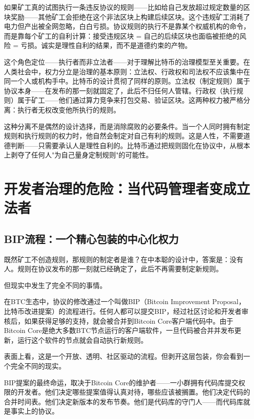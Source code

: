 \documentclass[a4paper,12pt,openany]{ctexbook}
\begin{document}
如果矿工真的试图执行一条违反协议的规则——比如给自己发放超过规定数量的区块奖励——其他矿工会拒绝在这个非法区块上构建后续区块。这个违规矿工消耗了电力但产出被全网忽略，白白亏损。协议规则的执行不是靠某个权威机构的命令，而是靠每个矿工的自利计算：接受违规区块 = 自己的后续区块也面临被拒绝的风险 = 亏损。诚实是理性自利的结果，而不是道德约束的产物。

这个角色定位——执行者而非立法者——对于理解比特币的治理模型至关重要。在人类社会中，权力分立是治理的基本原则：立法权、行政权和司法权不应该集中在同一个人或机构手中。比特币的设计贯彻了同样的原则。立法权（制定规则）属于协议本身——在发布的那一刻就固定了，此后不归任何人管辖。行政权（执行规则）属于矿工——他们通过算力竞争来打包交易、验证区块。这两种权力被严格分离：执行者无权改变他所执行的规则。

这种分离不是偶然的设计选择，而是消除腐败的必要条件。当一个人同时拥有制定规则和执行规则的权力时，他自然会制定对自己有利的规则。这是人性，不需要道德判断——只需要承认人是理性自利的。比特币通过把规则固化在协议中，从根本上剥夺了任何人"为自己量身定制规则"的可能性。


\section*{开发者治理的危险：当代码管理者变成立法者}



\subsection*{BIP流程：一个精心包装的中心化权力}


既然矿工不创造规则，那规则的制定者是谁？在中本聪的设计中，答案是：没有人。规则在协议发布的那一刻就已经确定了，此后不再需要制定新规则。

但现实中发生了完全不同的事情。

在BTC生态中，协议的修改通过一个叫做BIP（Bitcoin Improvement Proposal，比特币改进提案）的流程进行。任何人都可以提交BIP，经过社区讨论和开发者审核后，如果获得足够的支持，就会被合并到Bitcoin Core客户端代码中。由于Bitcoin Core是绝大多数BTC节点运行的客户端软件，一旦代码被合并并发布更新，运行这个软件的节点就会自动执行新规则。

表面上看，这是一个开放、透明、社区驱动的流程。但剥开这层包装，你会看到一个完全不同的现实。

BIP提案的最终命运，取决于Bitcoin Core的维护者——一小群拥有代码库提交权限的开发者。他们决定哪些提案值得认真对待，哪些应该被搁置。他们决定代码的合并时间表。他们决定新版本的发布节奏。他们是代码库的守门人——而代码库就是事实上的协议。
\end{document}
